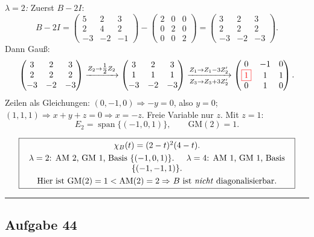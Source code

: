 \documentclass[a4paper,12pt]{article}
\newcommand{\piv}[1]{{\color{red}\boxed{#1}}}
\begin{document}
\textit{$\lambda = 2$:} Zuerst $B - 2I$:
\[
B - 2I = \begin{pmatrix} 5 & 2 & 3 \\ 2 & 4 & 2 \\ -3 & -2 & -1 \end{pmatrix} - \begin{pmatrix} 2 & 0 & 0 \\ 0 & 2 & 0 \\ 0 & 0 & 2 \end{pmatrix} = \begin{pmatrix} 3 & 2 & 3 \\ 2 & 2 & 2 \\ -3 & -2 & -3 \end{pmatrix}.
\]
Dann Gau\ss:
\[
\begin{pmatrix} 3 & 2 & 3 \\ 2 & 2 & 2 \\ -3 & -2 & -3 \end{pmatrix}
\xrightarrow{Z_2 \to \tfrac12 Z_2}
\begin{pmatrix} 3 & 2 & 3 \\ 1 & 1 & 1 \\ -3 & -2 & -3 \end{pmatrix}
\xrightarrow[Z_3 \to Z_3 + 3Z_2']{Z_1 \to Z_1 - 3Z_2'}
\begin{pmatrix} 0 & -1 & 0 \\ \piv{1} & 1 & 1 \\ 0 & 1 & 0 \end{pmatrix}.
\]
Zeilen als Gleichungen: $(0,-1,0) \Rightarrow -y = 0$, also $y = 0$; \; $(1,1,1) \Rightarrow x + y + z = 0 \Rightarrow x = -z$. Freie Variable nur $z$. Mit $z=1$:
\[
E_2 = \operatorname{span}\{(-1, 0, 1)\}, \qquad \text{GM}(2) = 1.
\]

\[
\fbox{\parbox{0.93\textwidth}{\centering
$\chi_B(t) = (2-t)^2(4-t)$. \\[3pt]
$\lambda = 2$: AM $2$, GM $1$, Basis $\{(-1,0,1)\}$. \quad
$\lambda = 4$: AM $1$, GM $1$, Basis $\{(-1,-1,1)\}$. \\[3pt]
Hier ist GM$(2) = 1 < {}$AM$(2) = 2 \Rightarrow$ $B$ ist \emph{nicht} diagonalisierbar.
}}
\]

\bigskip
\hrule
\bigskip

\subsection*{Aufgabe 44}
\end{document}

